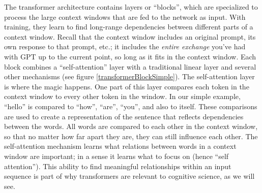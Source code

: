 The transformer architecture \cite{vaswani2017attention} contains layers or ``blocks'', which are specialized to process the large context windows that are fed to the network as input. With training, they learn to find long-range dependencies between different parts of a context window. Recall that the context window  includes an original prompt, its own response to that prompt, etc.; it includes the \emph{entire exchange} you've had with GPT up to the current point, so long as it fits in the context window. Each block combines a ``self-attention'' layer with a traditional linear layer and several other mechanisms (see figure \ref{transformerBlockSimple}). The self-attention layer is where the magic happens. One part of this layer compares each token in the context window to every other token in the window. In our simple example, ``hello'' is compared to ``how'', ``are'',  ``you'', and also to itself. These comparisons are used to create a representation of the sentence that reflects dependencies between the words. All words are compared to each other in the context window, so that no matter how far apart they are, they can still influence each other. The self-attention mechanism learns what relations between words in a context window are important; in a sense it learns what to focus on (hence ``self attention''). This ability to find meaningful relationships within an input sequence is part of why transformers are relevant to cognitive science, as we will see.

